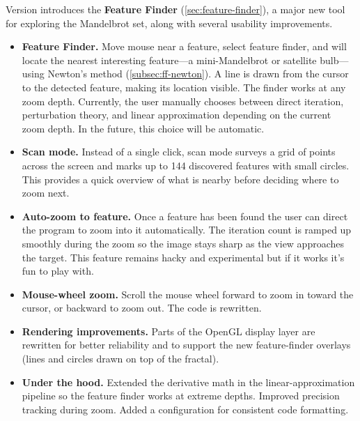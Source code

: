 Version  introduces the \textbf{Feature Finder} (\cref{sec:feature-finder}), a major new tool
for exploring the Mandelbrot set, along with several usability improvements.

\begin{itemize}
\item \textbf{Feature Finder.}  Move mouse near a feature, select feature
  finder, and \FractalShark{} will locate the nearest interesting feature---a
  mini-Mandelbrot or satellite bulb---using Newton's method (\cref{subsec:ff-newton}).  A line is drawn
  from the cursor to the detected feature, making its location visible.
  The finder works at any zoom depth.  Currently, the user manually chooses between
  direct iteration, perturbation theory, and linear approximation depending on
  the current zoom depth.  In the future, this choice will be automatic.

\item \textbf{Scan mode.}  Instead of a single click, scan mode surveys a grid
  of points across the screen and marks up to 144 discovered features with small
  circles.  This provides a quick overview of what is nearby before deciding
  where to zoom next.

\item \textbf{Auto-zoom to feature.}  Once a feature has been found the user can direct
  the program to zoom into it automatically.  The iteration count is ramped up
  smoothly during the zoom so the image stays sharp as the view approaches the target.
  This feature remains hacky and experimental but if it works it's fun to
  play with.

\item \textbf{Mouse-wheel zoom.}  Scroll the mouse wheel forward to zoom in
  toward the cursor, or backward to zoom out.  The code is rewritten.

\item \textbf{Rendering improvements.}  Parts of the OpenGL display layer are
  rewritten for better reliability and to support the new feature-finder
  overlays (lines and circles drawn on top of the fractal).

\item \textbf{Under the hood.}  Extended the derivative math in the
  linear-approximation pipeline so the feature finder works at extreme depths.
  Improved precision tracking during zoom.  Added a 
  configuration for consistent code formatting.
\end{itemize}

